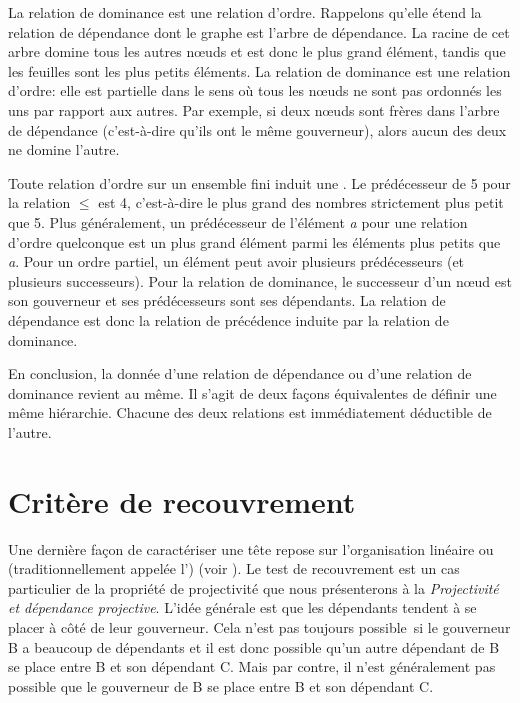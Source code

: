 {    La relation de dominance est une relation d’ordre. Rappelons qu’elle étend la relation de dépendance dont le graphe est l’arbre de dépendance. La racine de cet arbre domine tous les autres nœuds et est donc le plus grand élément, tandis que les feuilles sont les plus petits éléments. La relation de dominance est une relation d’ordre: elle est partielle dans le sens où tous les nœuds ne sont pas ordonnés les uns par rapport aux autres. Par exemple, si deux nœuds sont frères dans l’arbre de dépendance (c’est-à-dire qu’ils ont le même gouverneur), alors aucun des deux ne domine l’autre.

    Toute relation d’ordre sur un ensemble fini induit une . Le prédécesseur de 5 pour la relation ${\leq}$ est 4, c’est-à-dire le plus grand des nombres strictement plus petit que 5. Plus généralement, un prédécesseur de l’élément \textit{a} pour une relation d’ordre quelconque est un plus grand élément parmi les éléments plus petits que \textit{a}. Pour un ordre partiel, un élément peut avoir plusieurs prédécesseurs (et plusieurs successeurs). Pour la relation de dominance, le successeur d’un nœud est son gouverneur et ses prédécesseurs sont ses dépendants. La relation de dépendance est donc la relation de précédence induite par la relation de dominance.

    En conclusion, la donnée d’une relation de dépendance ou d’une relation de dominance revient au même. Il s’agit de deux façons équivalentes de définir une même hiérarchie. Chacune des deux relations est immédiatement déductible de l’autre.
}
\section{Critère de recouvrement}\label{sec:3.3.32}

Une dernière façon de caractériser une tête repose sur l’organisation linéaire ou  (traditionnellement appelée l’) (voir ). Le test de recouvrement est un cas particulier de la propriété de projectivité que nous présenterons à la  \textit{Projectivité et dépendance projective}. L’idée générale est que les dépendants tendent à se placer à côté de leur gouverneur. Cela n’est pas toujours possible~si le gouverneur B a beaucoup de dépendants et il est donc possible qu’un autre dépendant de B se place entre B et son dépendant C. Mais par contre, il n’est généralement pas possible que le gouverneur de B se place entre B et son dépendant C.

